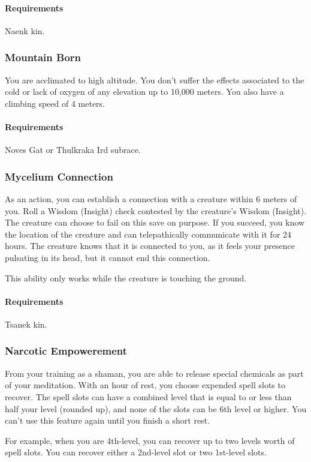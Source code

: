     \paragraph{Requirements} Naenk kin.
\subsubsection{Mountain Born} \label{feat::mountainborn}
    You are acclimated to high altitude.
    You don't suffer the effects associated to the cold or lack of oxygen of any elevation up to 10,000 meters.
    You also have a climbing speed of 4 meters.
    \paragraph{Requirements} Noves Gat or Thulkraka Ird subrace.
\subsubsection{Mycelium Connection} \label{feat::myceliumconnection}
    As an action, you can establish a connection with a creature within 6 meters of you.
    Roll a Wisdom (Insight) check contested by the creature's Wisdom (Insight).
    The creature can choose to fail on this save on purpose.
    If you succeed, you know the location of the creature and can telepathically communicate with it for 24 hours.
    The creature knows that it is connected to you, as it feels your presence pulsating in its head, but it cannot end this connection.

    This ability only works while the creature is touching the ground.
    \paragraph{Requirements} Tsanek kin.
\subsubsection{Narcotic Empowerement} \label{feat::narcoticempowerement}
    From your training as a shaman, you are able to release special chemicals as part of your meditation.
    With an hour of rest, you choose expended spell slots to recover.
    The spell slots can have a combined level that is equal to or less than half your level (rounded up), and none of the slots can be 6th level or higher.
    You can't use this feature again until you finish a short rest.

    For example, when you are 4th-level, you can recover up to two levels worth of spell slots.
    You can recover either a 2nd-level slot or two 1st-level slots.
